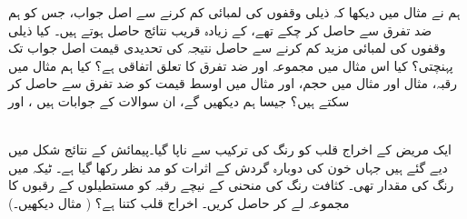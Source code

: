 ہم نے مثال  میں دیکھا کہ ذیلی وقفوں کی لمبائی کم کرنے سے اصل جواب، جس کو ہم ضد تفرق سے حاصل کر چکے تھے،  کے زیادہ قریب نتائج حاصل ہوتے ہیں۔ کیا ذیلی وقفوں کی لمبائی مزید کم کرنے سے حاصل نتیجہ کی تحدیدی قیمت اصل جواب تک پہنچتی؟ کیا اس مثال میں مجموعہ اور ضد تفرق کا تعلق اتفاقی ہے؟ کیا ہم مثال  میں رقبہ، مثال  اور مثال  میں حجم،  اور مثال  میں اوسط قیمت کو ضد تفرق سے حاصل کر سکتے ہیں؟ جیسا ہم دیکھیں گے،  ان سوالات کے جوابات ہیں  ،  اور 




\\
ایک مریض کے اخراج قلب کو رنگ کی ترکیب سے ناپا گیا۔پیمائش کے نتائج  شکل   میں دیے گئے ہیں جہاں خون کی دوبارہ گردش کے اثرات کو مد نظر رکھا گیا ہے۔ ٹیکہ میں رنگ کی مقدار  تھی۔ کثافت رنگ کی منحنی کے نیچے رقبہ کو مستطیلوں کے رقبوں کا مجموعہ لے کر حاصل کریں۔ اخراج قلب کتنا ہے؟ ( مثال  دیکھیں۔)\\

